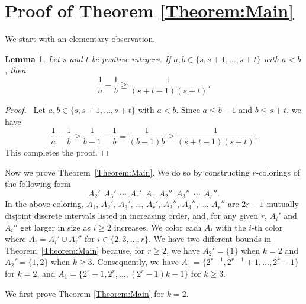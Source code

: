 \documentclass[10pt,a4paper]{amsart}
\newtheorem{lemma}[theorem]{Lemma}
\begin{document}
\section{Proof of Theorem \ref{Theorem:Main}}\label{Section:ProofMainTheorem}
We start with an elementary observation.
\begin{lemma}\label{Lemma:Elementary}
    Let $s$ and $t$ be positive integers. If $a,b\in\{s,s+1,\ldots,s+t\}$ with $a<b$, then
    \[
    \frac{1}{a}-\frac{1}{b}\geq\frac{1}{(s+t-1)(s+t)}.
    \]
\end{lemma}
\begin{proof}\
Let $a,b\in\{s,s+1,\ldots,s+t\}$ with $a<b$. Since $a\leq b-1$ and $b\leq s+t$, we have
    \[
    \frac{1}{a}-\frac{1}{b}\geq\frac{1}{b-1}-\frac{1}{b}=\frac{1}{(b-1)b}\geq\frac{1}{(s+t-1)(s+t)}.
    \]
This completes the proof.
\end{proof}

Now we prove Theorem~\ref{Theorem:Main}. We do so by constructing $r$-colorings of the following form
\[
A_2'\ \ A_3'\ \ \cdots\ \  A_r'\ \ A_1\ \ A_2''\ \ A_3''\ \ \cdots\ \ A_r''.
\]
In the above coloring, $A_1$, $A_2'$, $A_3'$, \ldots, $A_r'$, $A_2''$, $A_3''$, \ldots, $A_r''$ are $2r-1$ mutually disjoint discrete intervals listed in increasing order, and, for any given $r$, $A_i'$ and $A_i''$ get larger in size as $i\geq2$ increases. We color each $A_i$ with the $i$-th color where $A_i=A_i'\cup A_i''$ for $i\in\{2,3,\ldots,r\}$. We have two different bounds in Theorem~\ref{Theorem:Main} because, for $r\geq2$, we have $A_2'=\{1\}$ when $k=2$ and $A_2'=\{1,2\}$ when $k\geq3$. Consequently, we have $A_1=\{2^{r-1},2^{r-1}+1,\ldots,2^r-1\}$ for $k=2$, and $A_1=\{2^r-1,2^r,\ldots,(2^r-1)k-1\}$ for $k\geq3$.

We first prove Theorem \ref{Theorem:Main} for $k=2$.
\end{document}
